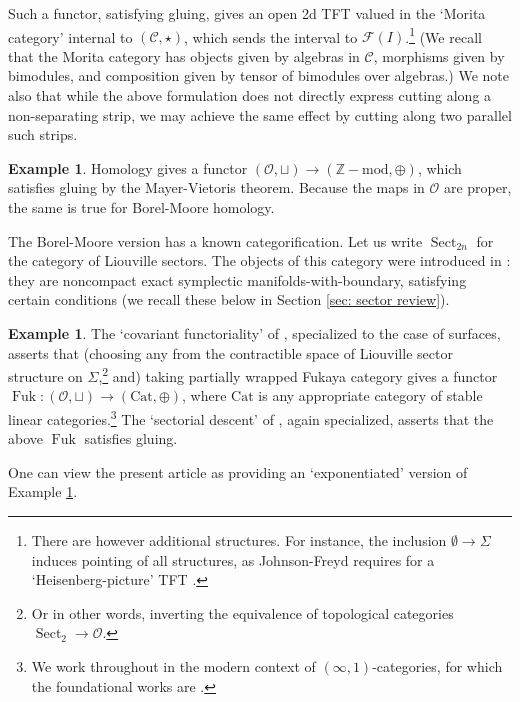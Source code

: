 \documentclass{article}
\def\Z{\mathbb{Z}}
\DeclareMathOperator{\Sect}{Sect}
\DeclareMathOperator{\Fuk}{Fuk}
\theoremstyle{definition}
\newtheorem{example}[theorem]{Example}
\begin{document}
Such a functor, satisfying gluing, gives an open 2d TFT valued in the `Morita category' internal to $(\mathcal{C}, \star)$, which sends the interval to $\mathcal{F}(I)$.\footnote{There are however additional structures.  For instance, the inclusion $\emptyset \to \Sigma$ induces pointing of all structures, as Johnson-Freyd requires for a `Heisenberg-picture'  TFT  \cite{Johnson-Freyd}.} %
(We recall that the Morita category has objects given by algebras in $\mathcal{C}$, morphisms given by bimodules, and composition given by tensor of bimodules over algebras.)
We note also that while the above formulation does not directly express cutting along a non-separating strip, we may achieve the same effect by cutting along two parallel such strips. 

\begin{example}
    Homology gives a functor $(\mathscr{O}, \sqcup) \to (\Z-\mathrm{mod}, \oplus)$, which satisfies gluing by the Mayer-Vietoris theorem.
    Because the maps in $\mathscr{O}$ are proper, the same is true for Borel-Moore homology.
\end{example} 


The Borel-Moore version has a known categorification.  Let us write $\Sect_{2n}$ for the category of Liouville sectors.  The objects of this category were introduced in \cite{GPS1, GPS2}: they are noncompact exact symplectic manifolds-with-boundary, satisfying certain conditions (we recall these below in Section \ref{sec: sector review}).  

\begin{example}  \label{GPS surfaces}
The `covariant functoriality' of \cite{GPS1}, specialized to the case of surfaces, 
asserts that (choosing any from the contractible space of Liouville sector structure on $\Sigma$,\footnote{Or in other words, inverting the equivalence  of topological categories $\Sect_2 \to \mathcal{O}$.} and) taking partially wrapped Fukaya category  gives a  functor $\Fuk: (\mathscr{O}, \sqcup) \to (\mathrm{Cat}, \oplus)$,  where $\mathrm{Cat}$ is any appropriate category of stable linear categories.\footnote{We work throughout in the modern context of $(\infty,1)$-categories, for which the foundational works are \cite{lurie-topos, lurie-algebra}. }  The `sectorial descent' of \cite{GPS2}, again specialized, asserts that the above $\Fuk$ satisfies gluing. 
\end{example}

One can view the present article as providing an `exponentiated' version of Example \ref{GPS surfaces}. 
\end{document}
